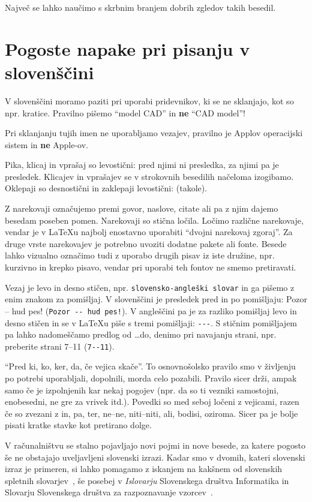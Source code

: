 \documentclass[a4paper,12pt,openright]{book}
\begin{document}
    Največ se lahko naučimo s skrbnim branjem dobrih zgledov takih besedil.


    \chapter{Pogoste napake pri pisanju v slovenščini}  %
    \label{slo}

    V slovenščini moramo paziti pri uporabi pridevnikov, ki se ne sklanjajo, kot so npr. kratice.
    Pravilno pišemo ``model CAD'' in \textbf{ne} ``CAD model''!

    Pri sklanjanju tujih imen ne uporabljamo vezajev, pravilno je Applov operacijski sistem in \textbf{ne} Apple-ov.

    Pika, klicaj in vprašaj so levostični: pred njimi ni presledka, za njimi pa je presledek.
    Klicajev in vprašajev se v strokovnih besedilih načeloma izogibamo. Oklepaji so desnostični in zaklepaji levostični: (takole).

    Z narekovaji označujemo premi govor, naslove, citate ali pa z njim dajemo besedam poseben pomen. Narekovaji so stična ločila. Ločimo različne narekovaje, vendar je v
    \LaTeX u najbolj enostavno uporabiti ``dvojni narekovaj zgoraj''. Za druge vrste narekovajev je potrebno uvoziti dodatne pakete ali fonte.
    Besede lahko vizualno označimo tudi z uporabo drugih pisav iz iste družine, npr.
    kurzivno in krepko pisavo, vendar pri uporabi teh fontov ne smemo pretiravati.

    Vezaj je levo in desno stičen, npr. \verb=slovensko-angleški slovar= in ga pišemo z enim znakom za pomišljaj.
    V slovenščini je presledek pred in po pomišljaju: Pozor -- hud pes! (\verb=Pozor -- hud pes!=).
    V angleščini pa je za razliko pomišljaj levo in desno stičen in se v \LaTeX u piše s tremi pomišljaji: \verb=---=.
    S stičnim pomišljajem pa lahko nadomeščamo predlog od \dots do, denimo pri navajanju strani, npr. preberite strani 7--11 (\verb=7--11=).

    ``Pred ki, ko, ker, da, če vejica skače''.
    To osnovnošolsko pravilo smo v življenju po potrebi uporabljali, dopolnili, morda celo pozabili.
    Pravilo sicer drži, ampak samo če je izpolnjenih kar nekaj pogojev (npr. da so ti vezniki samostojni, enobesedni, ne gre za vrivek itd.).
    Povedki so med seboj ločeni z vejicami, razen če so zvezani z in, pa, ter, ne–ne, niti–niti, ali, bodisi, oziroma.
    Sicer pa je bolje pisati kratke stavke kot pretirano dolge.

    V računalništvu se stalno pojavljajo novi pojmi in nove besede, za katere pogosto še ne obstajajo uveljavljeni slovenski izrazi.
    Kadar smo v dvomih, kateri slovenski izraz je primeren, si lahko pomagamo z iskanjem na kakšnem od slovenskih spletnih slovarjev~\cite{slovarji}, še posebej v
    \textit{Islovarju} Slovenskega društva Informatika \cite{Islovar} in Slovarju Slovenskega društva za razpoznavanje vzorcev~\cite{sdrv}.
\end{document}
